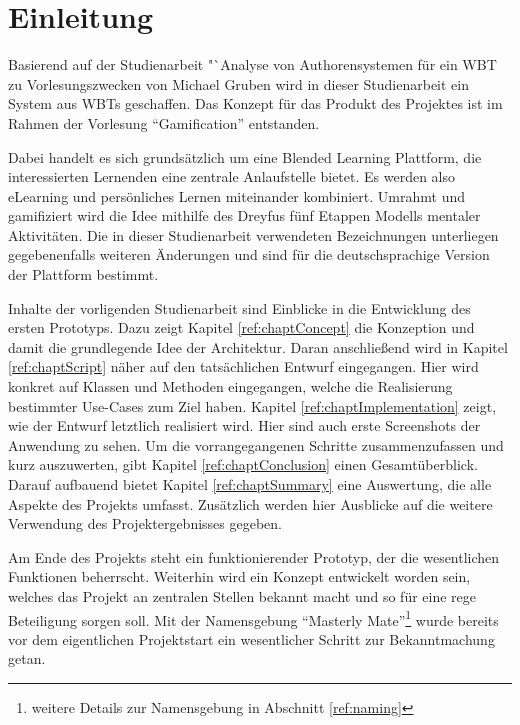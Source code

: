 \chapter{Einleitung}\label{ref:chaptIntroduction}
Basierend auf der Studienarbeit "`Analyse von Authorensystemen für ein WBT zu
Vorlesungszwecken von Michael Gruben \cite{gruben:2012} wird in dieser
Studienarbeit ein System aus \ac{WBT}s geschaffen. Das Konzept für das
Produkt des Projektes ist im Rahmen der Vorlesung "`Gamification"' entstanden.

Dabei handelt es sich grundsätzlich um eine Blended Learning Plattform, die
interessierten Lernenden eine zentrale Anlaufstelle bietet. Es werden also
eLearning und persönliches Lernen miteinander kombiniert. Umrahmt und
gamifiziert wird die Idee mithilfe des Dreyfus fünf Etappen Modells mentaler
Aktivitäten. Die in dieser Studienarbeit verwendeten Bezeichnungen unterliegen
gegebenenfalls weiteren Änderungen und sind für die deutschsprachige Version der
Plattform bestimmt.

Inhalte der vorligenden Studienarbeit sind Einblicke in die Entwicklung des
ersten Prototyps. Dazu zeigt Kapitel \ref{ref:chaptConcept} die Konzeption und
damit die grundlegende Idee der Architektur. Daran anschließend wird in Kapitel
\ref{ref:chaptScript} näher auf den tatsächlichen Entwurf eingegangen. Hier
wird konkret auf Klassen und Methoden eingegangen, welche die Realisierung
bestimmter Use-Cases zum Ziel haben. Kapitel \ref{ref:chaptImplementation}
zeigt, wie der Entwurf letztlich realisiert wird. Hier sind auch erste
Screenshots der Anwendung zu sehen. Um die vorrangegangenen Schritte
zusammenzufassen und kurz auszuwerten, gibt Kapitel \ref{ref:chaptConclusion}
einen Gesamtüberblick. Darauf aufbauend bietet Kapitel \ref{ref:chaptSummary}
eine Auswertung, die alle Aspekte des Projekts umfasst. Zusätzlich werden hier
Ausblicke auf die weitere Verwendung des Projektergebnisses gegeben.

Am Ende des Projekts steht ein funktionierender Prototyp, der die wesentlichen
Funktionen beherrscht. Weiterhin wird ein Konzept entwickelt worden sein,
welches das Projekt an zentralen Stellen bekannt macht und so für eine rege
Beteiligung sorgen soll. Mit der Namensgebung "`Masterly Mate"'\footnote{weitere
Details zur Namensgebung in Abschnitt \ref{ref:naming}} wurde bereits vor dem
eigentlichen Projektstart ein wesentlicher Schritt zur Bekanntmachung getan.
